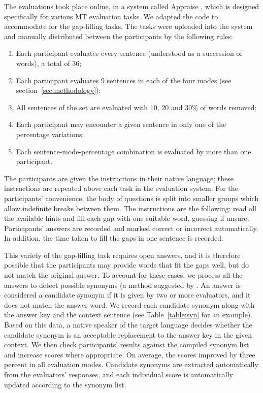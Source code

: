 \documentclass[11pt]{article}
\begin{document}
The evaluations took place online, in a system called Appraise \citep{federmann12}, which is 
designed specifically for various MT evaluation tasks. We adapted the code to 
accommodate for the gap-filling tasks. The tasks were uploaded into the system and 
manually distributed between the participants by the following rules:
\begin{enumerate}
\item  Each participant evaluates every sentence (understood as a succession of words),
a total of 36;
\item  Each participant evaluates 9 sentences in each of the four modes (see section~\ref{sec:methodology});
\item  All sentences of the set are evaluated with 10, 20 and 30\% of words removed;
\item Each participant may encounter a given sentence in only one of the percentage variations;
\item  Each sentence-mode-percentage combination is evaluated by more than one participant.
\end{enumerate}

The participants are given the instructions in their native language; these instructions are repeated above each task in the evaluation system. For the participants' convenience, the body of questions is split into smaller groups which allow indefinite breaks between them. The instructions are the 
following: read all the available hints and fill each gap with one suitable word, guessing if unsure.
Participants' answers are recorded and marked correct or incorrect automatically. In
addition, the time taken to fill the gaps in one sentence is recorded.

This variety of the gap-filling task requires open answers, and it is therefore possible that the participants may
provide words that fit the gaps well, but do not match the original answer. To account for
these cases, we process all the answers to detect possible synonyms (a method suggested by \citet{oregan13}. An answer is
considered a candidate synonym if it is given by two or more evaluators, and it does not match
the answer word. We record each candidate synonym along with the answer key and the
context sentence (see Table~\ref{table:syn} for an example). Based on this data, a native speaker of the target language decides
whether the candidate synonym is an acceptable replacement to the answer key in the given
context. We then check participants' results against the compiled synonym list and
increase scores where appropriate. On average, the scores improved by three percent in all evaluation modes. Candidate synonyms are extracted automatically from the evaluators' responses,  and each individual score is automatically updated according to the synonym list.
\end{document}
